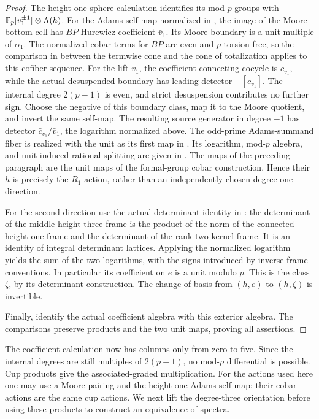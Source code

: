 \begin{proof}
The height-one sphere calculation identifies its mod-\(p\)
groups with
\(\mathbb F_p[v_1^{\pm1}]\otimes\Lambda(h)\).
For the Adams self-map normalized in
, the image of the Moore bottom
cell has \(BP\)-Hurewicz coefficient \(\bar v_1\).  Its Moore boundary
is a unit multiple of \(\alpha_1\).  The normalized cobar terms for
\(BP\) are even and \(p\)-torsion-free, so the comparison in
 between the termwise cone and the cone of
totalization applies to this cofiber sequence.
For the lift \(v_1\), the coefficient connecting cocycle is
\(c_{v_1}\), while the actual desuspended boundary has leading
detector \(-[c_{v_1}]\).  The internal degree \(2(p-1)\) is
even, and strict desuspension contributes no further sign.
Choose the negative of this boundary class, map it to the Moore
quotient, and invert the same self-map.  The resulting source
generator in degree \(-1\) has detector
\(\bar c_{v_1}/\bar v_1\), the logarithm normalized above.
The odd-prime Adams-summand fiber is realized
with the unit as its first map in \cite[Section~4.2, pp.~30--32]{BB}.
Its logarithm, mod-\(p\) algebra, and unit-induced rational splitting
are given in \cite[Section~4.3, Remarks~4.16--4.17 and (4.18)]{BB}.
The maps of the preceding paragraph are the unit maps of
the formal-group cobar construction.  Hence their \(h\)
is precisely the \(R_1\)-action, rather than an independently
chosen degree-one direction.

For the second direction use the actual determinant
identity in : the determinant
of the middle height-three frame is the product of the
norm of the connected height-one frame and the determinant
of the rank-two kernel frame.  It is an identity of
integral determinant lattices.  Applying the normalized
logarithm yields the sum of the two logarithms, with
the signs introduced by inverse-frame conventions.
In particular its coefficient on \(e\) is a unit modulo
\(p\).  This is the class \(\zeta\), by its determinant
construction.  The change of basis from \((h,e)\) to
\((h,\zeta)\) is invertible.

Finally, 
identify the actual coefficient algebra with this exterior
algebra.  The comparisons preserve products and the
two unit maps, proving all assertions.
\end{proof}

The coefficient calculation now has columns only from zero
to five.  Since the internal degrees are still multiples
of \(2(p-1)\), no mod-\(p\) differential is possible.
Cup products give the associated-graded multiplication.
For the actions used here one may use a Moore pairing
and the height-one Adams self-map; their cobar actions
are the same cup actions.  We next lift the degree-three
orientation before using these products to construct an
equivalence of spectra.

